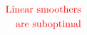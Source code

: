 \documentclass[10pt]{article}
\begin{document}
\begin{align*}
\textcolor{red}{\text{Linear smoothers}}\\
\textcolor{red}{\text{are suboptimal}}\end{align*}
\end{document}
